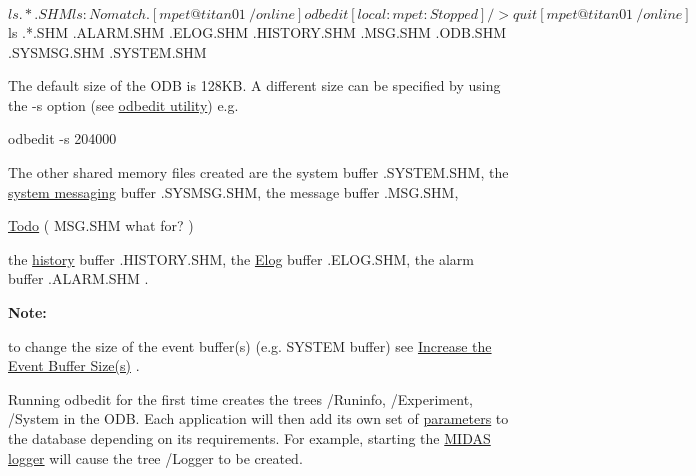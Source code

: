 \begin{DoxyCode}
$ ls .*.SHM
ls: No match.
[mpet@titan01 ~/online] odbedit
[local:mpet:Stopped]/>quit
[mpet@titan01 ~/online]$ ls .*.SHM
.ALARM.SHM  .ELOG.SHM  .HISTORY.SHM  .MSG.SHM  .ODB.SHM  .SYSMSG.SHM  .SYSTEM.SHM
      
\end{DoxyCode}


The default size of the ODB is 128KB. A different size can be specified by using the -\/s option (see \hyperlink{RC_odbedit_utility}{odbedit utility}) e.g. 
\begin{DoxyCode}
odbedit -s 204000
\end{DoxyCode}


The other shared memory files created are the system buffer .SYSTEM.SHM, the \hyperlink{F_Messaging}{system messaging} buffer .SYSMSG.SHM, the message buffer .MSG.SHM, \begin{Desc}
\item[\hyperlink{todo__todo000016}{Todo}]( MSG.SHM what for? )\end{Desc}
the \hyperlink{F_History_logging}{history} buffer .HISTORY.SHM, the \hyperlink{F_Elog}{Elog} buffer .ELOG.SHM, the alarm buffer .ALARM.SHM . \par


{\bfseries Note:} \par
to change the size of the event buffer(s) (e.g. SYSTEM buffer) see \hyperlink{FE_event_buffer_size}{Increase the Event Buffer Size(s)} . \par
  Running odbedit for the first time creates the trees /Runinfo, /Experiment, /System in the ODB.  Each application will then add its own set of \hyperlink{structparameters}{parameters} to the database depending on its requirements. For example, starting the \hyperlink{F_Logging_F_mlogger_utility}{MIDAS logger} will cause the tree /Logger to be created.



